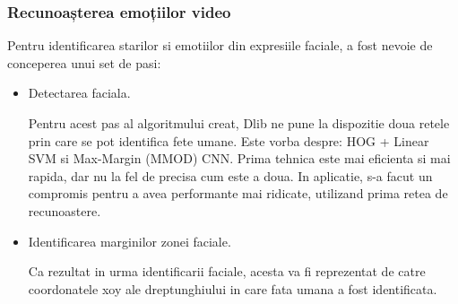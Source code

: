 \documentclass[a4paper, 12pt]{report}
\begin{document}
	\subsubsection{Recunoașterea emoțiilor video}
	Pentru identificarea starilor si emotiilor din expresiile faciale, a fost nevoie de conceperea unui set de pasi:
	\begin{itemize}
		\item Detectarea faciala.
				
		Pentru acest pas al algoritmului creat, Dlib ne pune la dispozitie doua retele prin care se pot identifica fete umane. Este vorba despre: HOG + Linear SVM si Max-Margin (MMOD) CNN. Prima tehnica este mai eficienta si mai rapida, dar nu la fel de precisa cum este a doua. In aplicatie, s-a facut un compromis pentru a avea performante mai ridicate, utilizand prima retea de recunoastere. 
		
		\item Identificarea marginilor zonei faciale.
		
		Ca rezultat in urma identificarii faciale, acesta va fi reprezentat de catre coordonatele xoy ale dreptunghiului in care fata umana a fost identificata.
		

\end{itemize}
\end{document}
